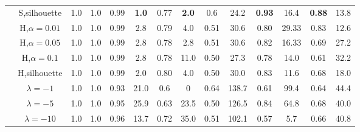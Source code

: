 \begin{table*}
\begin{center}
{\begin{tabular}[th]{cccccccccccccc}
                                                                                    & S,silhouette      & 1.0  & 1.0        & 0.99 & \textbf{1.0}        & 0.77 & \textbf{2.0}          & 0.6  & 24.2                & \textbf{0.93} & 16.4       & \textbf{0.88} & 13.8\\
                
                                                                                    & H,$\alpha=0.01$   & 1.0  & 1.0        & 0.99 & 2.8                 & 0.79 & 4.0                   & 0.51 & 30.6                & 0.80 & 29.33      & 0.83 & 12.6 \\
                
                                                                                    & H,$\alpha=0.05$   & 1.0  & 1.0        & 0.99 & 2.8                 & 0.78 & 2.8                   & 0.51 & 30.6                & 0.82 & 16.33      & 0.69 & 27.2 \\
                
                                                                                    & H,$\alpha=0.1$    & 1.0  & 1.0        & 0.99 & 2.8                 & 0.78 & 11.0                  & 0.50 & 27.3                & 0.78 & 14.0       & 0.61 & 32.2   \\
                
                                                                                    & H,silhouette      & 1.0  & 1.0        & 0.99 & 2.0                 & 0.80 & 4.0                   & 0.50 & 30.0                & 0.83 & 11.6       & 0.68 & 18.0  \\
                \midrule
        \parbox[t]{2mm}{}    & $\lambda=-1$      & 1.0  & 1.0       & 0.93 & 21.0        & 0.6  & 0          & 0.64 & 138.7      &  0.61 & 99.4        &0.64 & 44.4 \\
                
                                                                                    & $\lambda=-5$      & 1.0  & 1.0       & 0.95 & 25.9        & 0.63  & 23.5      & 0.50 & 126.5        & 0.84 & 64.8       &0.68 & 40.0 \\
                
                                                                                    & $\lambda=-10$     & 1.0  & 1.0       & 0.96 & 13.7        & 0.72  & 35.0      & 0.51 & 102.1        & 0.57 & 5.7         &0.66 & 40.8 \\
                \bottomrule
        
                
            
        \end{tabular}
        }
        \label{tab:Results}
    \end{center}
\end{table*}



